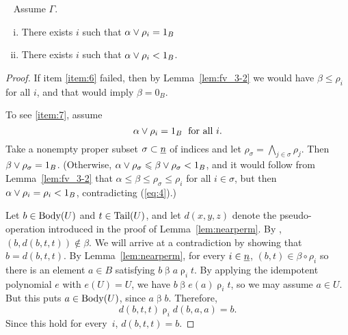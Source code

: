 \begin{lemma}\
  \label{lem:fv_3-3}
  Assume $\Gamma$.
  \begin{enumerate}[(i)]
    \item \label{item:6} There exists $i$
      such that $\alpha \join \rho_i = 1_B$
    \item \label{item:7} There exists $i$ such that
      $\alpha \join \rho_i < 1_B$.
  \end{enumerate}
\end{lemma}
\begin{proof}
If item \eqref{item:6} failed, then by Lemma~\ref{lem:fv_3-2} we would
have $\beta \leq \rho_i$ for all $i$, and that
would imply $\beta = 0_B$.

To see \eqref{item:7}, assume
\begin{equation} \label{eq:4}
\alpha \join \rho_i = 1_B \; \text{ for all $i$.}
\end{equation}
Take a nonempty proper subset $\sigma \subset \underline{n}$ of indices and let
$\rho_\sigma = \bigwedge_{j\in \sigma} \rho_j$.
Then $\beta \join \rho_\sigma = 1_B$. (Otherwise,
$\alpha \join \rho_\sigma \leq \beta \join \rho_\sigma < 1_B$,
and it would follow from Lemma~\ref{lem:fv_3-2} that
$\alpha \leq \beta \leq \rho_\sigma \leq \rho_i$ for all $i \in \sigma$,
but then $\alpha \join \rho_i = \rho_i < 1_B$, contradicting (\ref{eq:4}).)




Let $b \in \operatorname{Body}(U)$ and $t \in \operatorname{Tail}(U)$, and let $d(x,y,z)$
denote the pseudo-\malcev operation introduced in the proof of Lemma~\ref{lem:nearperm}. By
\cite[Lemma~4.25]{HM:1988},  $(b, d(b,t,t)) \notin \beta$.
We will arrive at a contradiction by showing that
$b = d(b,t,t)$. By Lemma~\ref{lem:nearperm}, for every $i \in \underline{n}$,
$(b,t) \in \beta \circ \rho_i$ so
there is an element $a \in B$ satisfying
$b\mathrel\beta a \mathrel\rho_i t$. By applying the idempotent
polynomial $e$ with $e(U) = U$, we have
$b\mathrel\beta e(a) \mathrel\rho_i t$, so we may
assume $a \in U$. But this puts $a \in \operatorname{Body}(U)$,
since $a\mathrel \beta b$. Therefore,
\[
d(b,t,t) \mathrel\rho_i d(b,a,a) = b.
\]
Since this hold for every~$i$, $d(b,t,t) = b$.
\end{proof}


